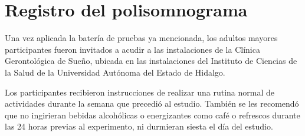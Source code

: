 
\section{Registro del polisomnograma}

Una vez aplicada
la bater\'ia de pruebas ya mencionada, los adultos mayores
participantes fueron invitados a acudir a las instalaciones de la Cl\'inica Gerontol\'ogica de 
Sue\~no, ubicada en las instalaciones del Instituto de Ciencias de la Salud de la Universidad 
Aut\'onoma del Estado de Hidalgo.

Los participantes recibieron instrucciones de realizar una rutina normal de actividades durante la 
semana que precedi\'o al estudio. Tambi\'en se les recomend\'o que no ingirieran bebidas 
alcoh\'olicas o energizantes como caf\'e o refrescos durante las 24 horas previas al experimento, 
ni durmieran siesta el d\'ia del estudio. 


